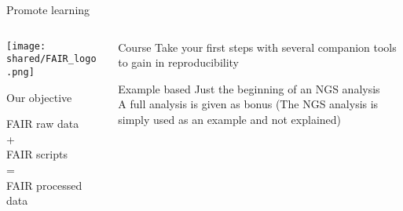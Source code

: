 \begin{frame}{Promote learning}  
  \begin{columns}
    \begin{column}{.3\textwidth}
     \texttt{[image: shared/FAIR\_logo.png]}
     \begin{block}{Our objective}
       \begin{center}
       FAIR raw data\\
       +\\
       FAIR scripts\\
       =\\
       FAIR processed data
       \end{center}
     \end{block}
    \end{column}
    \begin{column}{.55\textwidth}
    \begin{block}{Course}
    Take your first steps with several companion tools to gain in reproducibility
    \end{block}
     \begin{block}{Example based}
       Just the beginning of an NGS analysis\\
       A full analysis is given as bonus (The NGS analysis is simply used as an example and not explained)
     \end{block}
    \end{column}
  \end{columns}
\end{frame}